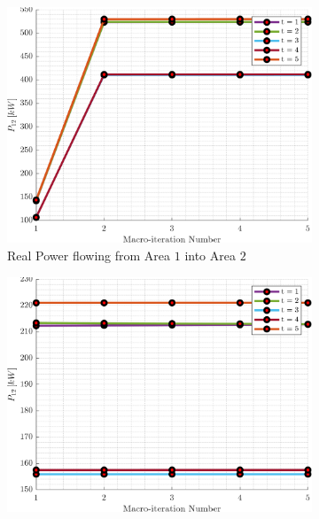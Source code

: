 \documentclass[../../outputs/main.tex]{subfiles}
\begin{document}
\begin{figure}[h!]
    \centering
    \begin{subfigure}[b]{0.3\textwidth}
        \centering
        \includegraphics[width=\textwidth]{../figures/T5-pv20-batt30-genCost/dopf/convergenceCurves/BoundaryRealPower_vs_t_vs_macroItr_T_5_Areas_1_2_genCost_pv_20_batt_30_crop.png}
        \caption{\scriptsize Real Power flowing from Area $1$ into Area $2$}
        \label{fig:real_power_1_2}
    \end{subfigure}
    \hfill
    \begin{subfigure}[b]{0.3\textwidth}
        \centering
        \includegraphics[width=\textwidth]{../figures/T5-pv20-batt30-genCost/dopf/convergenceCurves/BoundaryRealPower_vs_t_vs_macroItr_T_5_Areas_1_3_genCost_pv_20_batt_30_crop.png}

\end{subfigure}
\end{figure}
\end{document}
